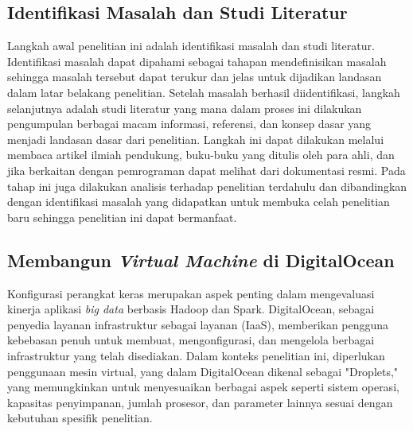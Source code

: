 \subsection{Identifikasi Masalah dan Studi Literatur}
Langkah awal penelitian ini adalah identifikasi masalah dan studi literatur. Identifikasi masalah dapat dipahami sebagai tahapan mendefinisikan masalah sehingga masalah tersebut dapat terukur dan jelas untuk dijadikan landasan dalam latar belakang penelitian. Setelah masalah berhasil diidentifikasi, langkah selanjutnya adalah studi literatur yang mana dalam proses ini dilakukan pengumpulan berbagai macam informasi, referensi, dan konsep dasar yang menjadi landasan dasar dari penelitian. Langkah ini dapat dilakukan melalui membaca artikel ilmiah pendukung, buku-buku yang ditulis oleh para ahli, dan jika berkaitan dengan pemrograman dapat melihat dari dokumentasi resmi. Pada tahap ini juga dilakukan analisis terhadap penelitian terdahulu dan dibandingkan dengan identifikasi masalah yang didapatkan untuk membuka celah penelitian baru sehingga penelitian ini dapat bermanfaat. 

\subsection{Membangun \textit{Virtual Machine} di DigitalOcean}
Konfigurasi perangkat keras merupakan aspek penting dalam mengevaluasi kinerja aplikasi \textit{big data} berbasis Hadoop dan Spark. DigitalOcean, sebagai penyedia layanan infrastruktur sebagai layanan (IaaS), memberikan pengguna kebebasan penuh untuk membuat, mengonfigurasi, dan mengelola berbagai infrastruktur yang telah disediakan. Dalam konteks penelitian ini, diperlukan penggunaan mesin virtual, yang dalam DigitalOcean dikenal sebagai "Droplets," yang memungkinkan untuk menyesuaikan berbagai aspek seperti sistem operasi, kapasitas penyimpanan, jumlah prosesor, dan parameter lainnya sesuai dengan kebutuhan spesifik penelitian.

